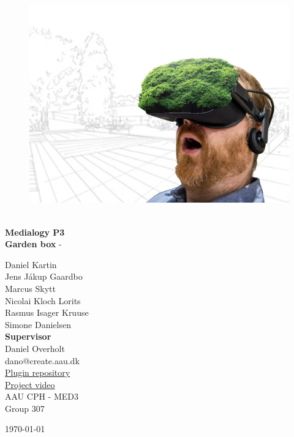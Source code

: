 \begin{titlepage}
			
\addtolength{\voffset}{2cm}

\begin{figure}[H]
\centering
\vspace{2cm}	%
\includegraphics[width=0.99\linewidth]{figure/Frontpage/gardenposterCropped.png}
\end{figure}

\mbox{}
\vfill
\renewcommand{\familydefault}{\sfdefault} \normalfont %
\HRule\\[0.1cm]
\textbf{{\small Medialogy P3\\ {\Huge Garden box}}} \hspace{0.15cm} {\Huge -} \\
\HRule\smallskip{}
\begin{multicols}{2}
{\Large Daniel Kartin\\Jens Jákup Gaardbo\\Marcus Skytt\\Nicolai Kloch Lorits\\Rasmus Isager Kruuse\\Simone Danielsen\columnbreak}\\
\setlength{\parskip}{2.4cm}
{\Large{\textbf{Supervisor}\\Daniel Overholt\\dano@create.aau.dk}}\medskip\\
\href{https://github.com/CakeFTW/unityOpencvPlugin}{\color{blue}Plugin repository}\\
\href{https://youtu.be/wmZ-fhU4JIE}{\color{blue}Project video}\medskip
\\\small AAU CPH - 
MED3 \\
Group 307\\
\end{multicols}
\today
\renewcommand{\familydefault}{\rmdefault} \normalfont %
\end{titlepage}


